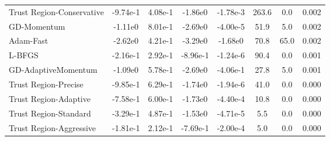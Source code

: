 \documentclass{article}
\begin{document}
\begin{table}[htbp]
{\begin{tabular}{p{2.5cm}*{7}{c}}
Trust Region-Conservative & -9.74e-1 & 4.08e-1 & -1.86e0 & -1.78e-3 & 263.6 & 0.0 & 0.002 \\
GD-Momentum & -1.11e0 & 8.01e-1 & -2.69e0 & -4.00e-5 & 51.9 & 5.0 & 0.002 \\
Adam-Fast & -2.62e0 & 4.21e-1 & -3.29e0 & -1.68e0 & 70.8 & 65.0 & 0.002 \\
L-BFGS & -2.16e-1 & 2.92e-1 & -8.96e-1 & -1.24e-6 & 90.4 & 0.0 & 0.001 \\
GD-AdaptiveMomentum & -1.09e0 & 5.78e-1 & -2.69e0 & -4.06e-1 & 27.8 & 5.0 & 0.001 \\
Trust Region-Precise & -9.85e-1 & 6.29e-1 & -1.74e0 & -1.94e-6 & 41.0 & 0.0 & 0.000 \\
Trust Region-Adaptive & -7.58e-1 & 6.00e-1 & -1.73e0 & -4.40e-4 & 10.8 & 0.0 & 0.000 \\
Trust Region-Standard & -3.29e-1 & 4.87e-1 & -1.53e0 & -4.71e-5 & 5.5 & 0.0 & 0.000 \\
Trust Region-Aggressive & -1.81e-1 & 2.12e-1 & -7.69e-1 & -2.00e-4 & 5.0 & 0.0 & 0.000 \\
\bottomrule
\end{tabular}
}
\end{table}
\end{document}
